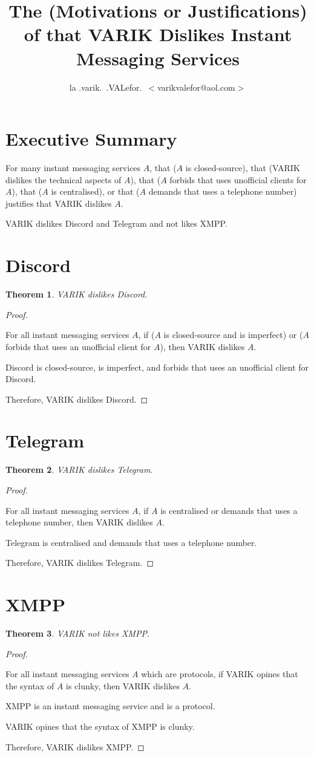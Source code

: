 \documentclass{article}
\title{The (Motivations or Justifications) of that VARIK Dislikes Instant Messaging Services}
\author{la .varik.\ .VALefor.\ $<$varikvalefor@aol.com$>$}
\newtheorem{thm}{Theorem}
\begin{document}
\maketitle

\section{Executive Summary}
For many instant messaging services $A$, that ($A$ is closed-source), that (VARIK dislikes the technical aspects of $A$), that ($A$ forbids that uses unofficial clients for $A$), that ($A$ is centralised), or that ($A$ demands that uses a telephone number) justifies that VARIK dislikes $A$.

VARIK dislikes Discord and Telegram and not likes XMPP.
\section{Discord}
\begin{thm}
	VARIK dislikes Discord.
\end{thm}
\begin{proof}
	${}$

	For all instant messaging services $A$, if ($A$ is closed-source and is imperfect) or ($A$ forbids that uses an unofficial client for $A$), then VARIK dislikes $A$.

	Discord is closed-source, is imperfect, and forbids that uses an unofficial client for Discord.

	Therefore, VARIK dislikes Discord.
\end{proof}

\section{Telegram}
\begin{thm}
	VARIK dislikes Telegram.
\end{thm}
\begin{proof}
	${}$

	For all instant messaging services $A$, if $A$ is centralised or demands that uses a telephone number, then VARIK dislikes $A$.

	Telegram is centralised and demands that uses a telephone number.

	Therefore, VARIK dislikes Telegram.
\end{proof}

\section{XMPP}
\begin{thm}
	VARIK not likes XMPP.
\end{thm}
\begin{proof}
	${}$

	For all instant messaging services $A$ which are protocols, if VARIK opines that the syntax of $A$ is clunky, then VARIK dislikes $A$.

	XMPP is an instant messaging service and is a protocol.

	VARIK opines that the syntax of XMPP is clunky.

	Therefore, VARIK dislikes XMPP.
\end{proof}
\end{document}
